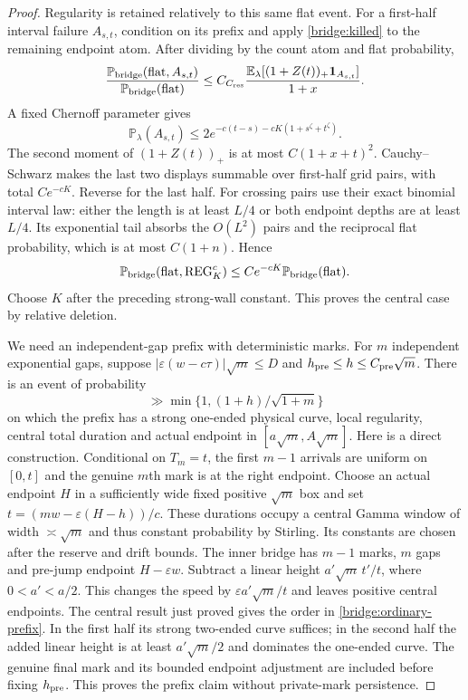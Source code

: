 \begin{proof}
Regularity is retained relatively to this same flat event. For a
first-half interval failure $A_{s,t}$, condition on its prefix and
apply \eqref{bridge:killed} to the remaining endpoint atom. After
dividing by the count atom and flat probability,
\[
 \frac{\mathbb P_{\rm bridge}(\text{flat},A_{s,t})}
      {\mathbb P_{\rm bridge}(\text{flat})}
 \le C_{C_{\rm res}}
       \frac{\mathbb E_\lambda[(1+Z(t))_+\mathbf1_{A_{s,t}}]}{1+x}.
\]
A fixed Chernoff parameter gives
\[
 \mathbb P_\lambda(A_{s,t})
 \le2e^{-c(t-s)-cK(1+s^\zeta+t^\zeta)}.
\]
The second moment of $(1+Z(t))_+$ is at most $C(1+x+t)^2$.
Cauchy--Schwarz makes the last two displays summable over first-half
grid pairs, with total $Ce^{-cK}$. Reverse for the last half. For
crossing pairs use their exact binomial interval law: either the
length is at least $L/4$ or both endpoint depths are at least $L/4$.
Its exponential tail absorbs the $O(L^2)$ pairs and the reciprocal
flat probability, which is at most $C(1+n)$. Hence
\begin{equation}
 \mathbb P_{\rm bridge}(\text{flat},\operatorname{REG}_K^c)
 \le Ce^{-cK}\mathbb P_{\rm bridge}(\text{flat}).
 \label{bridge:ordinary-relative}
\end{equation}
Choose $K$ after the preceding strong-wall constant. This proves the
central case by relative deletion.

We need an independent-gap prefix with deterministic marks. For
$m$ independent exponential gaps, suppose
$|\varepsilon(w-c\tau)|\sqrt m\le D$ and
$h_{\rm pre}\le h\le C_{\rm pre}\sqrt m$. There is an event of
probability
\begin{equation}
 \gg\min\{1,(1+h)/\sqrt{1+m}\}\label{bridge:ordinary-prefix}
\end{equation}
on which the prefix has a strong one-ended physical curve, local
regularity, central total duration and actual endpoint in
$[a\sqrt m,A\sqrt m]$. Here is a direct construction. Conditional
on $T_m=t$, the first $m-1$ arrivals are uniform on $[0,t]$ and
the genuine $m$th mark is at the right endpoint. Choose an actual
endpoint $H$ in a sufficiently wide fixed positive $\sqrt m$ box
and set $t=(mw-\varepsilon(H-h))/c$. These durations occupy a
central Gamma window of width $\asymp\sqrt m$ and thus constant
probability by Stirling. Its constants are chosen after the reserve
and drift bounds. The inner bridge has $m-1$ marks, $m$ gaps and
pre-jump endpoint $H-\varepsilon w$. Subtract a linear height
$a'\sqrt m\,t'/t$, where $0<a'<a/2$. This changes the speed by
$\varepsilon a'\sqrt m/t$ and leaves positive central endpoints.
The central result just proved gives the order in
\eqref{bridge:ordinary-prefix}. In the first half its strong
 two-ended curve suffices; in the second half the added linear
height is at least $a'\sqrt m/2$ and dominates the one-ended curve.
The genuine final mark and its bounded endpoint adjustment are
included before fixing $h_{\rm pre}$. This proves the prefix claim
without private-mark persistence.


\end{proof}
